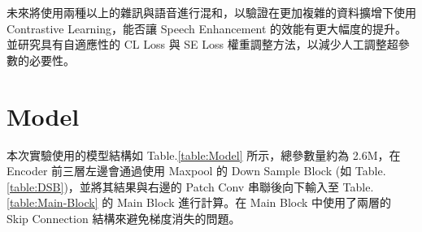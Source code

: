 \documentclass[10pt,twocolumn,letterpaper]{article}
\begin{document}
\begin{CJK}{UTF8}{bkai}
   未來將使用兩種以上的雜訊與語音進行混和，以驗證在更加複雜的資料擴增下使用 Contrastive
   Learning，能否讓 Speech Enhancement 的效能有更大幅度的提升。並研究具有自適應性的
   CL Loss 與 SE Loss 權重調整方法，以減少人工調整超參數的必要性。

   {\small
   
   
   }
   \newpage

   \appendix
   \section{Model} \label{Model}
   本次實驗使用的模型結構如 Table.\ref{table:Model} 所示，總參數量約為 2.6M，在 Encoder 前三層左邊會通過使用 Maxpool 的
   Down Sample Block (如 Table.\ref{table:DSB})，並將其結果與右邊的 Patch Conv 串聯後向下輸入至 Table.\ref{table:Main-Block} 的 Main Block
   進行計算。在 Main Block 中使用了兩層的 Skip Connection 結構來避免梯度消失的問題。


\end{CJK}
\end{document}
